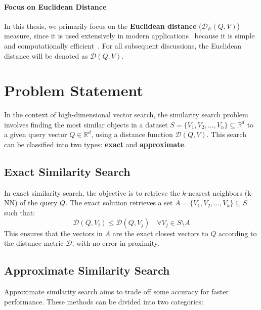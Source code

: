 \paragraph{Focus on Euclidean Distance}
In this thesis, we primarily focus on the \textbf{Euclidean distance} (\(\mathcal{D}_E(Q, V)\)) measure, since it is used extensively in modern
applications~\cite{Indyk1998, Datar2004,vamana,ngt_library,zhang2018visual,spfresh}  because it is simple and computationally efficient~\cite{Arya1998}. For all subsequent discussions, the Euclidean distance will be denoted as \(\mathcal{D}(Q, V)\).

\section{Problem Statement}
\label{sec:similarity_search}

In the context of high-dimensional vector search, the similarity search problem involves finding the most similar objects in a dataset \(S = \{V_1, V_2, \dots, V_n\} \subseteq \mathbb{R}^d\) to a given query vector \(Q \in \mathbb{R}^d\), using a distance function \(\mathcal{D}(Q, V)\). This search can be classified into two types: \textbf{exact} and \textbf{approximate}.

\subsection{Exact Similarity Search}
In exact similarity search, the objective is to retrieve the \(k\)-nearest neighbors (k-NN) of the query \(Q\). The exact solution retrieves a set \(A = \{V_1, V_2, \dots, V_k\} \subseteq S\) such that:
\begin{equation}
    \mathcal{D}(Q, V_i) \leq \mathcal{D}(Q, V_j) \quad \forall V_j \in S \setminus A
    \label{eq:exact_knn}
\end{equation}
This ensures that the vectors in \(A\) are the exact closest vectors to \(Q\) according to the distance metric \(\mathcal{D}\), with no error in proximity.

\subsection{Approximate Similarity Search}
Approximate similarity search aims to trade off some accuracy for faster performance. These methods can be divided into two categories:

